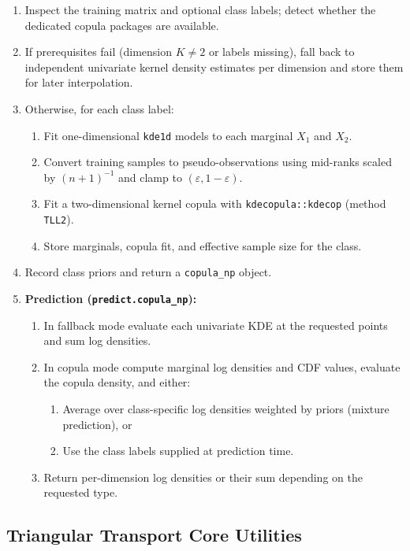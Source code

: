 \documentclass[11pt,a4paper,twoside]{book}\usepackage[]{graphicx}\usepackage[]{xcolor}
\begin{document}
\begin{enumerate}
  \item Inspect the training matrix and optional class labels; detect whether the dedicated copula packages are available.
  \item If prerequisites fail (dimension $K \neq 2$ or labels missing), fall back to independent univariate kernel density estimates per dimension and store them for later interpolation.
  \item Otherwise, for each class label:
    \begin{enumerate}
      \item Fit one-dimensional \texttt{kde1d} models to each marginal $X_1$ and $X_2$.
      \item Convert training samples to pseudo-observations using mid-ranks scaled by $(n+1)^{-1}$ and clamp to $(\varepsilon, 1-\varepsilon)$.
      \item Fit a two-dimensional kernel copula with \texttt{kdecopula::kdecop} (method \texttt{TLL2}).
      \item Store marginals, copula fit, and effective sample size for the class.
    \end{enumerate}
  \item Record class priors and return a \texttt{copula\_np} object.

  \item \textbf{Prediction (\texttt{predict.copula\_np}):}
    \begin{enumerate}
      \item In fallback mode evaluate each univariate KDE at the requested points and sum log densities.
      \item In copula mode compute marginal log densities and CDF values, evaluate the copula density, and either:
        \begin{enumerate}
          \item Average over class-specific log densities weighted by priors (mixture prediction), or
          \item Use the class labels supplied at prediction time.
        \end{enumerate}
      \item Return per-dimension log densities or their sum depending on the requested type.
    \end{enumerate}
\end{enumerate}

\subsection{Triangular Transport Core Utilities}\label{app:ttm-core}
\end{document}
